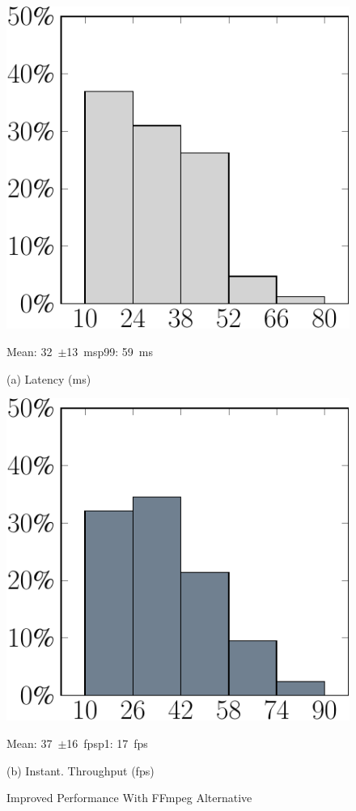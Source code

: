 \begin{figure}
\centering
\begin{minipage}[b]{0.49\linewidth}
\centering
\includegraphics[width=0.8\linewidth]{chapter5/FIGS/histo-pdraw-latency.pdf}\\
\begin{captext}
\centering
Mean: 32~$\pm$13~ms\hspace{0.1in}p99: 59~ms\\
\end{captext}
{\small (a) Latency (ms)}
\end{minipage}
\begin{minipage}[b]{0.49\linewidth}
\centering
\includegraphics[width=0.8\linewidth]{chapter5/FIGS/histo-pdraw-throughput.pdf}\\
\begin{captext}
\centering
Mean: 37~$\pm$16~fps\hspace{0.1in}p1: 17~fps\\
\end{captext}
{\small (b) Instant. Throughput (fps)}
\end{minipage}
\caption{Improved Performance With FFmpeg Alternative}
\label{fig:pdraw-histo}
\end{figure}


